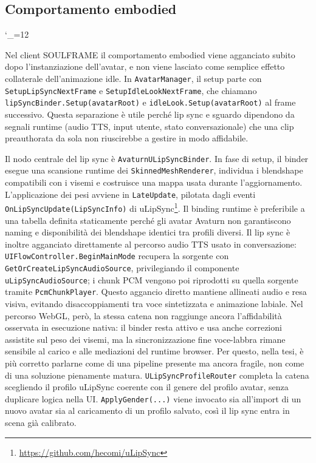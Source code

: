 \endgroup

\subsection{Comportamento embodied}
\label{subsec:embodied-behavior}
\begingroup
\setlength{\emergencystretch}{3em}
\hfuzz=200pt
\sloppy
\catcode`_=12\relax

Nel client SOULFRAME il comportamento embodied viene agganciato subito dopo l'instanziazione dell'avatar, e non viene lasciato come semplice effetto collaterale dell'animazione idle. In \texttt{AvatarManager}, il setup parte con \texttt{SetupLipSyncNextFrame} e \texttt{SetupIdleLookNextFrame}, che chiamano \texttt{lipSyncBinder.Setup(avatarRoot)} e \texttt{idleLook.Setup(avatarRoot)} al frame successivo. Questa separazione è utile perché lip sync e sguardo dipendono da segnali runtime (audio TTS, input utente, stato conversazionale) che una clip preauthorata da sola non riuscirebbe a gestire in modo affidabile.

Il nodo centrale del lip sync è \texttt{AvaturnULipSyncBinder}. In fase di setup, il binder esegue una scansione runtime dei \texttt{SkinnedMeshRenderer}, individua i blendshape compatibili con i visemi e costruisce una mappa usata durante l'aggiornamento. L'applicazione dei pesi avviene in \texttt{LateUpdate}, pilotata dagli eventi \texttt{OnLipSyncUpdate(LipSyncInfo)} di uLipSync\footnote{\url{https://github.com/hecomi/uLipSync}}. Il binding runtime è preferibile a una tabella definita staticamente perché gli avatar Avaturn non garantiscono naming e disponibilità dei blendshape identici tra profili diversi. Il lip sync è inoltre agganciato direttamente al percorso audio TTS usato in conversazione: \texttt{UIFlowController.BeginMainMode} recupera la sorgente con \texttt{GetOrCreateLipSyncAudioSource}, privilegiando il componente \texttt{uLipSyncAudioSource}; i chunk PCM vengono poi riprodotti su quella sorgente tramite \texttt{PcmChunkPlayer}. Questo aggancio diretto mantiene allineati audio e resa visiva, evitando disaccoppiamenti tra voce sintetizzata e animazione labiale. Nel percorso WebGL, però, la stessa catena non raggiunge ancora l'affidabilità osservata in esecuzione nativa: il binder resta attivo e usa anche correzioni assistite sul peso dei visemi, ma la sincronizzazione fine voce-labbra rimane sensibile al carico e alle mediazioni del runtime browser. Per questo, nella tesi, è più corretto parlarne come di una pipeline presente ma ancora fragile, non come di una soluzione pienamente matura. \texttt{ULipSyncProfileRouter} completa la catena scegliendo il profilo uLipSync coerente con il genere del profilo avatar, senza duplicare logica nella UI. \texttt{ApplyGender(...)} viene invocato sia all'import di un nuovo avatar sia al caricamento di un profilo salvato, così il lip sync entra in scena già calibrato.

